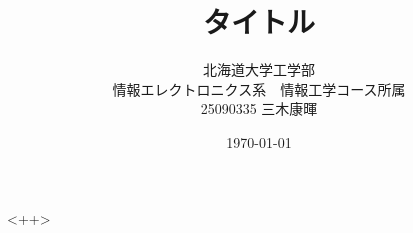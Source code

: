 \documentclass[12pt]{jarticle}
\begin{document}
\title{タイトル}
\author{北海道大学工学部\\
情報エレクトロニクス系　情報工学コース所属\\
25090335 三木康暉}
\date{\today}
\maketitle

\clearpage

<++>
\end{document}
